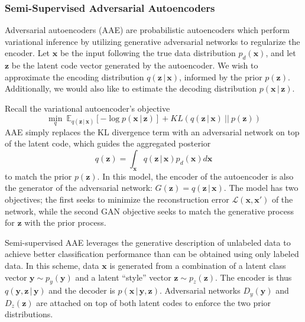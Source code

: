 \documentclass{article}
\newcommand{\vect}[1]{\boldsymbol{#1}}
\newcommand{\E}{\mathbb{E}}
\newcommand{\given}{\,\vert\,}
\begin{document}
\subsubsection{Semi-Supervised Adversarial Autoencoders} \label{sssec:aae}

Adversarial autoencoders (AAE) \cite{aae} are probabilistic autoencoders which perform variational inference by utilizing generative adversarial networks to regularize the encoder. Let $\vect{x}$ be the input following the true data distribution $p_d(\vect{x})$, and let $\vect{z}$ be the latent code vector generated by the autoencoder. We wish to approximate the encoding distribution $q(\vect{z}\given\vect{x})$, informed by the prior $p(\vect{z})$. Additionally, we would also like to estimate the decoding distribution $p(\vect{x}\given\vect{z})$. 

Recall the variational autoencoder's objective \cite{vae}
\begin{equation}
\min_q \
\E_{q(\vect{z}\given\vect{x})} [-\log p(\vect{x}\given\vect{z})] + KL(q(\vect{z}\given\vect{x}) \ \vert\vert \ p(\vect{z}))
\end{equation}
AAE simply replaces the KL divergence term with an adversarial network on top of the latent code, which guides the aggregated posterior
\begin{equation}
q(\vect{z}) = \int_{\vect{x}} q(\vect{z}\given\vect{x}) p_d(\vect{x}) d\vect{x}
\end{equation}
to match the prior $p(\vect{z})$. In this model, the encoder of the autoencoder is also the generator of the adversarial network: $G(\vect{z}) = q(\vect{z}\given\vect{x})$. The model has two objectives; the first seeks to minimize the reconstruction error $\mathcal{L}(\vect{x}, \vect{x}')$ of the network, while the second GAN objective seeks to match the generative process for $\vect{z}$ with the prior process. 

Semi-supervised AAE leverages the generative description of unlabeled data to achieve better classification performance than can be obtained using only labeled data. In this scheme, data $\vect{x}$ is generated from a combination of a latent class vector $\vect{y} \sim p_y(\vect{y})$ and a latent ``style'' vector $\vect{z} \sim p_z(\vect{z})$. The encoder is thus $q(\vect{y}, \vect{z} \given \vect{y})$ and the decoder is $p(\vect{x} \given \vect{y}, \vect{z})$. Adversarial networks $D_y(\vect{y})$ and $D_z(\vect{z})$ are attached on top of both latent codes to enforce the two prior distributions.
\end{document}
